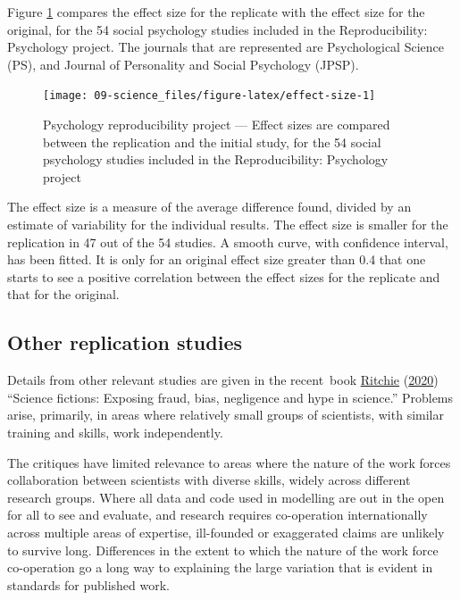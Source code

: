 \documentclass[
  10pt,
  b5paper]{book}
\begin{document}
Figure \ref{fig:effect-size} compares the effect size for
the replicate with the effect size for the original, for
the 54 social psychology studies included in the
Reproducibility: Psychology project. The journals that
are represented are Psychological Science (PS),
and Journal of Personality and Social Psychology (JPSP).

\begin{figure}[H]

{\centering \texttt{[image: 09-science\_files/figure-latex/effect-size-1]} 

}

\caption{Psychology reproducibility project --- Effect sizes are
compared between the replication and the initial study, for the 
54 social psychology studies included in the Reproducibility:
Psychology project}\label{fig:effect-size}
\end{figure}

The effect size is a measure of the average difference found,
divided by an estimate of variability for the individual
results. The effect size is smaller for the replication in 47
out of the 54 studies. A smooth curve, with confidence interval,
has been fitted. It is only for an original effect size
greater than 0.4 that one starts to see a positive correlation
between the effect sizes for the replicate and that for the
original.

\hypertarget{other-replication-studies}{%
\subsection*{Other replication studies}\label{other-replication-studies}}

Details from other relevant studies are given in the
recent~book \protect\hyperlink{ref-ritchie2020science}{Ritchie} (\protect\hyperlink{ref-ritchie2020science}{2020}) ``Science fictions: Exposing
fraud, bias, negligence and hype in science.''
Problems arise, primarily, in areas where relatively small
groups of scientists, with similar training and skills, work
independently.

The critiques have limited relevance to areas where the nature
of the work forces collaboration between scientists with
diverse skills, widely across different research groups.
Where all data and code used in modelling are out in the open
for all to see and evaluate, and research requires co-operation
internationally across multiple areas of expertise, ill-founded
or exaggerated claims are unlikely to survive long. Differences
in the extent to which the nature of the work force co-operation
go a long way to explaining the large variation that is evident
in standards for published work.
\end{document}
